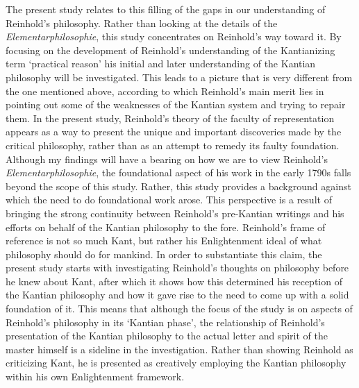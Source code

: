 The present study relates to this filling of the gaps in our understanding of Reinhold's philosophy. Rather than looking at the details of the \textit{Elementarphilosophie}, this study concentrates on Reinhold's way toward it. By focusing on the development of Reinhold's understanding of the Kantianizing term `practical reason' his initial and later understanding of the Kantian philosophy will be investigated. This leads to a picture that is very different from the one mentioned above, according to which Reinhold's main merit lies in pointing out some of the weaknesses of the Kantian system and trying to repair them. In the present study, Reinhold's theory of the faculty of representation appears as a way to present the unique and important discoveries made by the critical philosophy, rather than as an attempt to remedy its faulty foundation. Although my findings will have a bearing on how we are to view Reinhold's \textit{Elementarphilosophie}, the foundational aspect of his work in the early 1790s falls beyond the scope of this study. Rather, this study provides a background against which the need to do foundational work arose. This perspective is a result of bringing the strong continuity between Reinhold's pre{-}Kantian writings and his efforts on behalf of the Kantian philosophy to the fore. Reinhold's frame of reference is not so much Kant, but rather his Enlightenment ideal of what philosophy should do for mankind. In order to substantiate this claim, the present study starts with investigating Reinhold's thoughts on philosophy before he knew about Kant, after which it shows how this determined his reception of the Kantian philosophy and how it gave rise to the need to come up with a solid foundation of it. This means that although the focus of the study is on aspects of Reinhold's philosophy in its `Kantian phase', the relationship of Reinhold's presentation of the Kantian philosophy to the actual letter and spirit of the master himself is a sideline in the investigation. Rather than showing Reinhold as criticizing Kant, he is presented as creatively employing the Kantian philosophy within his own Enlightenment framework. 

